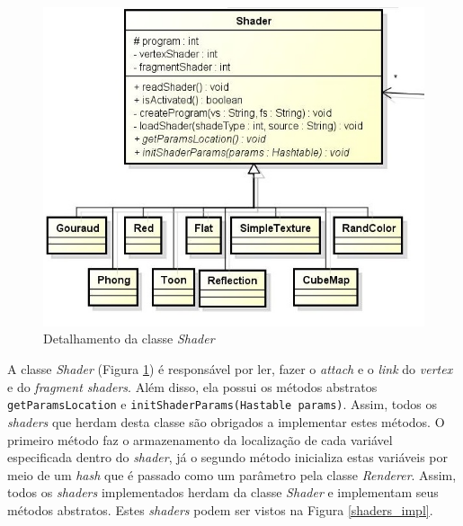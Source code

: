 	\begin{figure}[ht]
	\centering
		\includegraphics[keepaspectratio=true,scale=0.6]{figuras/shaders_diag.jpg}
	\caption{Detalhamento da classe \textit{Shader}}
	\label{shaders_diag}
	\end{figure}

	A classe \textit{Shader} (Figura \ref{shaders_diag}) é responsável por ler, fazer o \textit{attach} e o \textit{link} do \textit{ vertex} e do \textit{fragment shaders}. Além disso, ela possui os métodos abstratos \texttt{getParamsLocation} e \texttt{initShaderParams(Hastable params)}. Assim, todos os \textit{shaders} que herdam desta classe são obrigados a implementar estes métodos. O primeiro método faz o armazenamento da localização de cada variável especificada dentro do \textit{shader}, já o segundo método inicializa estas variáveis por meio de um \textit{hash} que é passado como um parâmetro pela classe \textit{Renderer}. Assim, todos os \textit{shaders} implementados herdam da classe \textit{Shader} e implementam seus métodos abstratos. Estes \textit{shaders} podem ser vistos na Figura \ref{shaders_impl}.  

